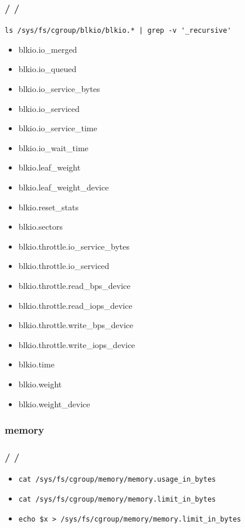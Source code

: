 \documentclass{beamer}
\newcommand{\autotitle}
{\frametitle{
    \secname
    \ifx\insertsubsection\empty
    \else
        /\subsecname
        \ifx\insertsubsubsection\empty\else/\subsubsecname\fi
    \fi}}
\begin{document}
\begin{frame}[fragile]
    \autotitle
    \verb!ls /sys/fs/cgroup/blkio/blkio.* | grep -v '_recursive'!
    \begin{multicols}{2}
        \begin{itemize}
            \item blkio.io\_merged
            \item blkio.io\_queued
            \item blkio.io\_service\_bytes
            \item blkio.io\_serviced
            \item blkio.io\_service\_time
            \item blkio.io\_wait\_time
            \item blkio.leaf\_weight
            \item blkio.leaf\_weight\_device
            \item blkio.reset\_stats
            \item blkio.sectors
            \item blkio.throttle.io\_service\_bytes
            \item blkio.throttle.io\_serviced
            \item blkio.throttle.read\_bps\_device
            \item blkio.throttle.read\_iops\_device
            \item blkio.throttle.write\_bps\_device
            \item blkio.throttle.write\_iops\_device
            \item blkio.time
            \item blkio.weight
            \item blkio.weight\_device
        \end{itemize}
    \end{multicols}
\end{frame}

\subsubsection{memory}

\begin{frame}[fragile]
    \autotitle
    \begin{itemize}
        \item \verb|cat /sys/fs/cgroup/memory/memory.usage_in_bytes|
        \item \verb|cat /sys/fs/cgroup/memory/memory.limit_in_bytes|
        \item \verb|echo $x > /sys/fs/cgroup/memory/memory.limit_in_bytes|
    \end{itemize}
\end{frame}
\end{document}
